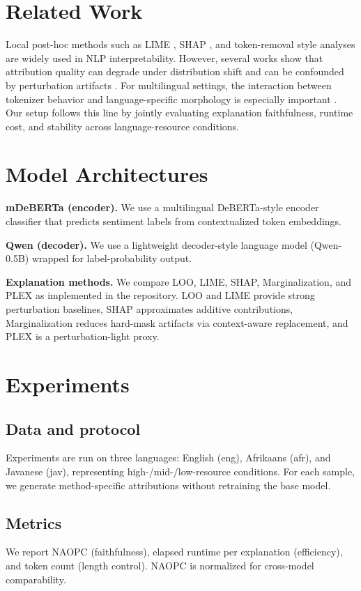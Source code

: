 \documentclass[11pt]{article}
\begin{document}
\section{Related Work}
Local post-hoc methods such as LIME \citep{ribeiro2016lime}, SHAP \citep{lundberg2017shap}, and token-removal style analyses \citep{li2016understanding} are widely used in NLP interpretability. However, several works show that attribution quality can degrade under distribution shift and can be confounded by perturbation artifacts \citep{hooker2019roar,atanasova2020diagnostic}. For multilingual settings, the interaction between tokenizer behavior and language-specific morphology is especially important \citep{wu2022multilingual}. Our setup follows this line by jointly evaluating explanation faithfulness, runtime cost, and stability across language-resource conditions.

\section{Model Architectures}
\textbf{mDeBERTa (encoder).} We use a multilingual DeBERTa-style encoder classifier that predicts sentiment labels from contextualized token embeddings.

\textbf{Qwen (decoder).} We use a lightweight decoder-style language model (Qwen-0.5B) wrapped for label-probability output.

\textbf{Explanation methods.} We compare LOO, LIME, SHAP, Marginalization, and PLEX as implemented in the repository. LOO and LIME provide strong perturbation baselines, SHAP approximates additive contributions, Marginalization reduces hard-mask artifacts via context-aware replacement, and PLEX is a perturbation-light proxy.

\section{Experiments}
\subsection{Data and protocol}
Experiments are run on three languages: English (eng), Afrikaans (afr), and Javanese (jav), representing high-/mid-/low-resource conditions. For each sample, we generate method-specific attributions without retraining the base model.

\subsection{Metrics}
We report NAOPC (faithfulness), elapsed runtime per explanation (efficiency), and token count (length control). NAOPC is normalized for cross-model comparability.
\end{document}

